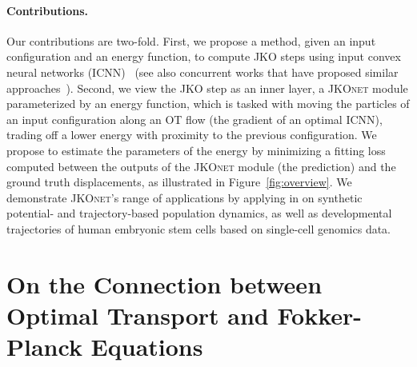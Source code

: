 \paragraph{Contributions.}\hspace{1em} Our contributions are two-fold. First, we propose a method, given an input configuration and an energy function, to compute JKO steps using input convex neural networks (ICNN)~\citep{amos2017input,makkuva2020optimal} (see also concurrent works that have proposed similar approaches~\citep{alvarez2021optimizing, mokrov2021large}). Second, we view the JKO step as an inner layer, a \textsc{JKOnet} module parameterized by an energy function, which is tasked with moving the particles of an input configuration along an OT flow (the gradient of an optimal ICNN), trading off a lower energy with proximity to the previous configuration.
We propose to estimate the parameters of the energy by minimizing a fitting loss %
computed between the outputs of the \textsc{JKOnet} module (the prediction) and the ground truth displacements, as illustrated in Figure~\ref{fig:overview}.
We demonstrate \textsc{JKOnet}'s range of applications by applying in on synthetic potential- and trajectory-based population dynamics, as well as developmental trajectories of human embryonic stem cells based on single-cell genomics data.


\section{On the Connection between Optimal Transport and Fokker-Planck Equations}

